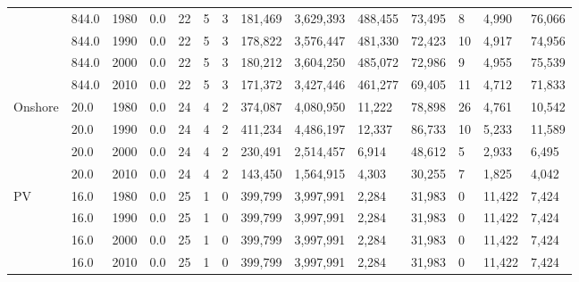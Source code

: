 \begin{table}[]
\begin{tabular}{|l|l|l|l|l|l|l|l|l|l|l|l|l|l|}
		& 844.0 & 1980 & 0.0 & 22 & 5 & 3 & 181,469 & 3,629,393 & 488,455 & 73,495 & 8 & 4,990 & 76,066 \\ \cline{2-14} 
		& 844.0 & 1990 & 0.0 & 22 & 5 & 3 & 178,822 & 3,576,447 & 481,330 & 72,423 & 10 & 4,917 & 74,956 \\ \cline{2-14} 
		& 844.0 & 2000 & 0.0 & 22 & 5 & 3 & 180,212 & 3,604,250 & 485,072 & 72,986 & 9 & 4,955 & 75,539 \\ \cline{2-14} 
		& 844.0 & 2010 & 0.0 & 22 & 5 & 3 & 171,372 & 3,427,446 & 461,277 & 69,405 & 11 & 4,712 & 71,833 \\ \hline
		\multirow{4}{*}{Onshore} & 20.0 & 1980 & 0.0 & 24 & 4 & 2 & 374,087 & 4,080,950 & 11,222 & 78,898 & 26 & 4,761 & 10,542 \\ \cline{2-14} 
		& 20.0 & 1990 & 0.0 & 24 & 4 & 2 & 411,234 & 4,486,197 & 12,337 & 86,733 & 10 & 5,233 & 11,589 \\ \cline{2-14} 
		& 20.0 & 2000 & 0.0 & 24 & 4 & 2 & 230,491 & 2,514,457 & 6,914 & 48,612 & 5 & 2,933 & 6,495 \\ \cline{2-14} 
		& 20.0 & 2010 & 0.0 & 24 & 4 & 2 & 143,450 & 1,564,915 & 4,303 & 30,255 & 7 & 1,825 & 4,042 \\ \hline
		\multirow{4}{*}{PV} & 16.0 & 1980 & 0.0 & 25 & 1 & 0 & 399,799 & 3,997,991 & 2,284 & 31,983 & 0 & 11,422 & 7,424 \\ \cline{2-14} 
		& 16.0 & 1990 & 0.0 & 25 & 1 & 0 & 399,799 & 3,997,991 & 2,284 & 31,983 & 0 & 11,422 & 7,424 \\ \cline{2-14} 
		& 16.0 & 2000 & 0.0 & 25 & 1 & 0 & 399,799 & 3,997,991 & 2,284 & 31,983 & 0 & 11,422 & 7,424 \\ \cline{2-14} 
		& 16.0 & 2010 & 0.0 & 25 & 1 & 0 & 399,799 & 3,997,991 & 2,284 & 31,983 & 0 & 11,422 & 7,424 \\ \hline
	\end{tabular}
\end{table}
